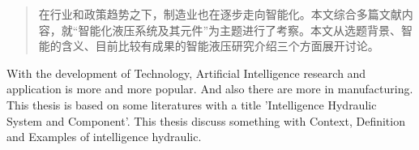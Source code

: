 
\begin{abstract}

在行业和政策趋势之下，制造业也在逐步走向智能化。本文综合多篇文献内容，就“智能化液压系统及其元件”为主题进行了考察。本文从选题背景、智能的含义、目前比较有成果的智能液压研究介绍三个方面展开讨论。

\end{abstract}

\begin{englishabstract}

With the development of Technology, Artificial Intelligence research and application is more and more popular. And also there are more in manufacturing. This thesis is based on some literatures with a title 'Intelligence Hydraulic System and Component'. This thesis discuss something with Context, Definition and Examples of intelligence hydraulic.

\end{englishabstract}

